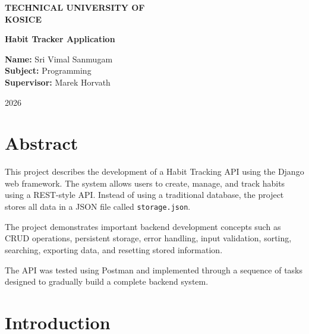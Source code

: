\documentclass[12pt]{article}
\begin{document}
\begin{titlepage}

\centering

\vspace*{2cm}

{\Huge \textbf{TECHNICAL UNIVERSITY OF}}\\[0.2cm]
{\Huge \textbf{KOSICE}}

\vspace{6cm}

{\LARGE \textbf{Habit Tracker Application}}

\vfill

\begin{flushleft}

\textbf{Name:} Sri Vimal Sanmugam \\[0.3cm]

\textbf{Subject:} Programming \\[0.3cm]

\textbf{Supervisor:} Marek Horvath

\end{flushleft}

\vspace{1cm}

2026

\end{titlepage}

\tab

\tableofcontents
\newpage

\section{Abstract}

This project describes the development of a Habit Tracking API using the Django web framework. 
The system allows users to create, manage, and track habits using a REST-style API. 
Instead of using a traditional database, the project stores all data in a JSON file 
called \texttt{storage.json}. 

The project demonstrates important backend development concepts such as CRUD operations, 
persistent storage, error handling, input validation, sorting, searching, exporting data, 
and resetting stored information. 

The API was tested using Postman and implemented through a sequence of tasks designed 
to gradually build a complete backend system.

\section{Introduction}
\end{document}
